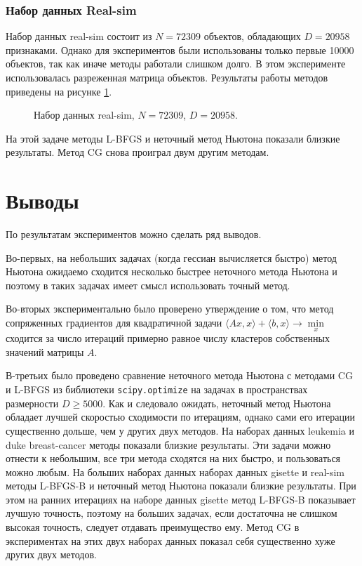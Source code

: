 \documentclass[12pt]{article}
\begin{document}
	\subsubsection{Набор данных Real-sim}
	
		Набор данных real-sim состоит из $N = 72309$ объектов, обладающих $D = 20958$ признаками. Однако для экспериментов были использованы только первые 10000 объектов, так как иначе методы работали слишком долго. В этом эксперименте использовалась разреженная матрица объектов. Результаты работы методов приведены на рисунке \ref{real-sim}.
		
		\begin{figure}[!h]
			\centering
			\subfloat{
				\scalebox{1.2}{
					
				}
			}
			\caption{Набор данных real-sim, $N = 72309$, $D = 20958$.}
			\label{real-sim}
		\end{figure}
		
		На этой задаче методы L-BFGS и неточный метод Ньютона показали близкие результаты. Метод CG снова проиграл двум другим методам.	

\pagebreak	
\section{Выводы}
	
	\hspace{0.5cm} По результатам экспериментов можно сделать ряд выводов. 
	
	Во-первых, на небольших задачах (когда гессиан вычисляется быстро) метод Ньютона ожидаемо сходится несколько быстрее неточного метода Ньютона и поэтому в таких задачах имеет смысл использовать точный метод. 
	
	Во-вторых экспериментально было проверено утверждение о том, что метод сопряженных градиентов для квадратичной задачи $\langle A x, x \rangle + \langle b, x \rangle \rightarrow \min\limits_x$ сходится за число итераций примерно равное числу кластеров собственных значений матрицы $A$.
	
	
	В-третьих было проведено сравнение неточного метода Ньютона с методами CG и L-BFGS из библиотеки \lstinline{scipy.optimize} на задачах в пространствах размерности \newline $D \ge 5000$. Как и следовало ожидать, неточный метод Ньютона обладает лучшей скоростью сходимости по итерациям, однако сами его итерации существенно дольше, чем у других двух методов. На наборах данных leukemia и duke breast-cancer методы показали близкие результаты. Эти задачи можно отнести к небольшим, все три метода сходятся на них быстро, и пользоваться можно любым. На больших наборах данных наборах данных gisette и real-sim методы L-BFGS-B и неточный метод Ньютона показали близкие результаты. При этом на ранних итерациях на наборе данных gisette метод L-BFGS-B показывает лучшую точность, поэтому на больших задачах, если достаточна не слишком высокая точность, следует отдавать преимущество ему. Метод CG в экспериментах на этих двух наборах данных показал себя существенно хуже других двух методов.
	
\end{document}
